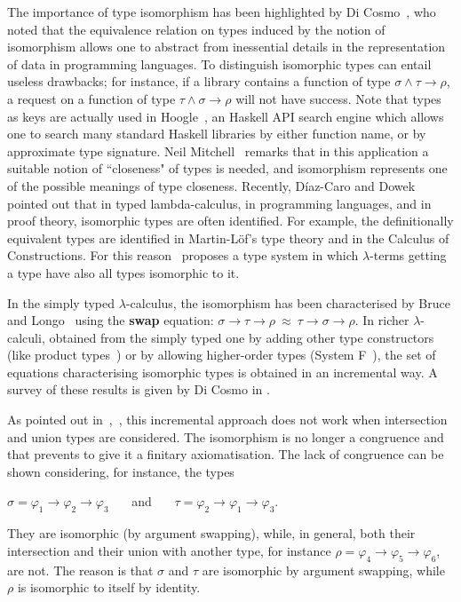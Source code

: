 \documentclass[UKenglish]{eptcs}
\newcommand{\tA}{\sigma}       \newcommand{\tB}{\tau}
\newcommand{\tC}{\rho}
\newcommand{\iso}{\approx}
\newcommand{\myformula}[1]{\\[0.5pt]\centerline{#1}}
\begin{document}
The importance of type isomorphism has been highlighted by Di Cosmo~\cite{Dicosmo93},
who noted that the equivalence relation on types induced by the notion of isomorphism allows one to abstract from inessential details in the representation of data in programming languages.
To distinguish isomorphic types can entail useless drawbacks; for instance, if a library contains a function of type $\tA\wedge\tB\to\tC$, a request on a function of type $\tB\wedge\tA\to\tC$ will not have success. Note that types as keys are actually used in Hoogle~\cite{mitj}, an Haskell API search engine which allows one to search many standard Haskell libraries by either function name, or by approximate type signature. Neil Mitchell~\cite{mit} remarks
that in this application  a suitable notion of  ``closeness" of types is needed, and isomorphism represents one of the possible meanings of type closeness.
Recently, D\'iaz-Caro and Dowek~\cite{DD14}  pointed out that in typed lambda-calculus, in programming languages, and in proof theory, isomorphic types are often identified. For example, the definitionally equivalent types are identified in Martin-L\"{o}f's type theory and in the Calculus of Constructions.
For this reason~\cite{DD14} proposes a type system in which $\lambda$-terms getting a type have also all types isomorphic to it.

In the simply typed $\lambda$-calculus, the isomorphism has been characterised by Bruce and Longo~\cite{BruceLongo85}
using
the {\bfseries swap} equation:\quad
$\sigma \rightarrow \tau \rightarrow \rho  ~\iso~  \tau \rightarrow \sigma\rightarrow
    \rho$.
    In
richer $\lambda$-calculi, obtained from the simply typed one by adding other
type constructors (like product types~\cite{Solovev83,BruceDicosmoLongo92,soloviev93complete}) or by allowing higher-order types (System F~\cite{BruceLongo85,Dicosmo93}), the set of equations characterising isomorphic types is obtained in an incremental way.
A survey of these results is given by Di Cosmo in
\cite{MSCSSurvey05}.



As pointed out in~\cite{DDGT10},~\cite{CDMZ13a}, this incremental approach
does not work when intersection and union types are considered. The isomorphism
is no longer a  congruence and that prevents to give it a finitary axiomatisation.
The lack of congruence can be shown considering,
for instance,
the types
\myformula{$\sigma = \varphi_1\to\varphi_2\to\varphi_3$ ~~~and~~~ $\tau = \varphi_2\to\varphi_1\to\varphi_3$.}  They are isomorphic (by argument swapping), while, in general,  both their intersection and their union with another type, for instance $\rho = \varphi_4\to\varphi_5\to\varphi_6$, are not. The reason is that $\sigma$ and $\tau$ are isomorphic by argument swapping, while $\rho$ is isomorphic to itself by identity.
\end{document}
